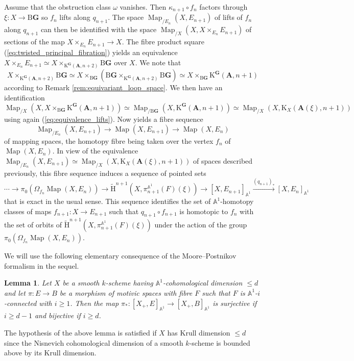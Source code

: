\documentclass[11pt,leqno]{amsart}
\renewcommand{\1}{{\rm 1\hspace*{-0.4ex}%
\rule{0.1ex}{1.52ex}\hspace*{0.2ex}}}
\newcommand{\Hr}{{\mathrm {H}}}
\newcommand{\<}[1]{{\langle}#1 {\rangle}}
\newcommand{\Kr}{\mathrm{K}}
\newcommand{\Abf}{\mathbf{A}}
\newcommand{\Abb}{\mathbb{A}}
\newcommand{\Gbf}{\mathbf{G}}
\newcommand{\Br}{\mathrm{B}}
\newcommand{\Map}{\operatorname{Map}}
\theoremstyle{plain}
\newtheorem{lem}[thm]{Lemma}
\theoremstyle{definition}
\theoremstyle{remark}
\numberwithin{equation}{section}
\begin{document}
Assume that the obstruction class $\omega$ vanishes. Then $\kappa_{n+1}\circ f_n$ factors through $\xi:X\to\Br\Gbf$ so $f_n$ lifts along $q_{n+1}$. The space $\Map_{/E_n}(X,E_{n+1})$ of lifts of $f_n$ along $q_{n+1}$ can then be identified with the space $\Map_{/X}(X,X\times_{E_n} E_{n+1})$ of sections of the map $X\times_{E_n}E_{n+1}\rightarrow X$. The fibre product square (\ref{eq:twisted_principal_fibration}) yields an equivalence $X\times_{E_n} E_{n+1}\simeq X\times_{\Kr^\Gbf(\Abf,n+2)}\Br\Gbf$ over $X$. We note that \[X\times_{\Kr^\Gbf(\Abf,n+2)}\Br\Gbf\simeq X\times_{\Br\Gbf}(\Br\Gbf\times_{\Kr^\Gbf(\Abf,n+2)}\Br\Gbf)\simeq X\times_{\Br\Gbf}\Kr^\Gbf(\Abf,n+1)\] according to Remark \ref{rem:equivariant_loop_space}. We then have an identification \[\Map_{/X}(X,X\times_{\Br\Gbf}\Kr^\Gbf(\Abf,n+1))\simeq\Map_{/\Br\Gbf}(X,\Kr^\Gbf(\Abf,n+1))\simeq\Map_{/X}(X,\Kr_{X}(\Abf(\xi),n+1))\] using again (\ref{eq:equivalence_lifts}). Now \cite[Lemma 5.5.5.12]{lurieHigherToposTheory2009} yields a fibre sequence \[\Map_{/E_n}(X,E_{n+1})\to\Map(X,E_{n+1})\to\Map(X,E_n)\] of mapping spaces, the homotopy fibre being taken over the vertex $f_n$ of $\Map(X,E_n)$. In view of the equivalence $\Map_{/E_n}(X,E_{n+1})\simeq\Map_{/X}(X,\Kr_X(\Abf(\xi),n+1))$ of spaces described previously, this fibre sequence induces a sequence of pointed sets \[\cdots\to\pi_0(\Omega_{f_n}\Map(X,E_n))\to\widetilde{\Hr}^{n+1}(X,\pi_{n+1}^{\Abb^1}(F)(\xi))\to[X,E_{n+1}]_{\Abb^1}\xrightarrow{(q_{n+1})_*}[X,E_n]_{\Abb^1}\] that is exact in the usual sense. This sequence identifies the set of $\Abb^1$-homotopy classes of maps $f_{n+1}:X\to E_{n+1}$ such that $q_{n+1}\circ f_{n+1}$ is homotopic to $f_n$ with the set of orbits of $\widetilde{\Hr}^{n+1}(X,\pi_{n+1}^{\Abb^1}(F)(\xi))$ under the action of the group $\pi_0(\Omega_{f_n}\Map(X,E_n))$.

We will use the following elementary consequence of the Moore--Postnikov formalism in the sequel.

\begin{lem}\label{lem:easy_moore--postnikov}
Let $X$ be a smooth $k$-scheme having $\Abb^1$-cohomological dimension $\leq d$ and let $\pi:E\to B$ be a morphism of motivic spaces with fibre $F$ such that $F$ is $\Abb^1$-$i$-connected with $i\geq 1$. Then the map $\pi_*:[X_+,E]_{\Abb^1}\to[X_+,B]_{\Abb^1}$ is surjective if $i\geq d-1$ and bijective if $i\geq d$.
\end{lem}

The hypothesis of the above lemma is satisfied if $X$ has Krull dimension $\leq d$ since the Nisnevich cohomological dimension of a smooth $k$-scheme is bounded above by its Krull dimension.
\end{document}
